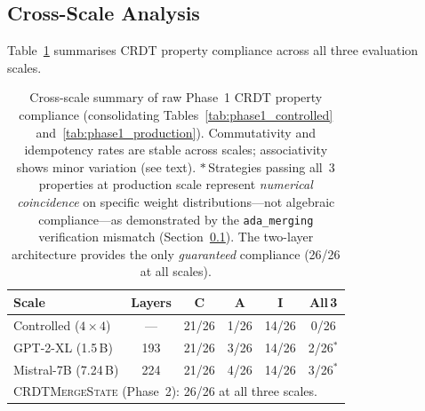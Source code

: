 \documentclass[10pt,letterpaper]{article}
\newcommand{\CMS}{\texorpdfstring{{\mdseries\upshape\textsc{CRDTMergeState}}}{CRDTMergeState}}
\begin{document}
\subsection{Cross-Scale Analysis}\label{sec:cross_scale}

Table~\ref{tab:cross_scale} summarises CRDT property compliance across all three evaluation scales.

\begin{table}[t]
\centering
\caption{Cross-scale summary of raw Phase~1 CRDT property compliance (consolidating Tables~\ref{tab:phase1_controlled} and~\ref{tab:phase1_production}).  Commutativity and idempotency rates are stable across scales; associativity shows minor variation (see text).  $\ast$\,Strategies passing all~3 properties at production scale represent \emph{numerical coincidence} on specific weight distributions---not algebraic compliance---as demonstrated by the \texttt{ada\_merging} verification mismatch (Section~\ref{sec:cross_scale}).  The two-layer architecture provides the only \emph{guaranteed} compliance (26/26 at all scales).}
\label{tab:cross_scale}
\small
\begin{tabular}{lccccc}
\toprule
Scale & Layers & C & A & I & All\,3 \\
\midrule
Controlled ($4\times 4$) & --- & 21/26 & 1/26 & 14/26 & 0/26 \\
GPT-2-XL (1.5\,B) & 193 & 21/26 & 3/26 & 14/26 & 2/26$^{\ast}$ \\
Mistral-7B (7.24\,B) & 224 & 21/26 & 4/26 & 14/26 & 3/26$^{\ast}$ \\
\midrule
\multicolumn{6}{l}{\CMS{} (Phase~2): 26/26 at all three scales.}\\
\bottomrule
\end{tabular}
\end{table}
\end{document}

